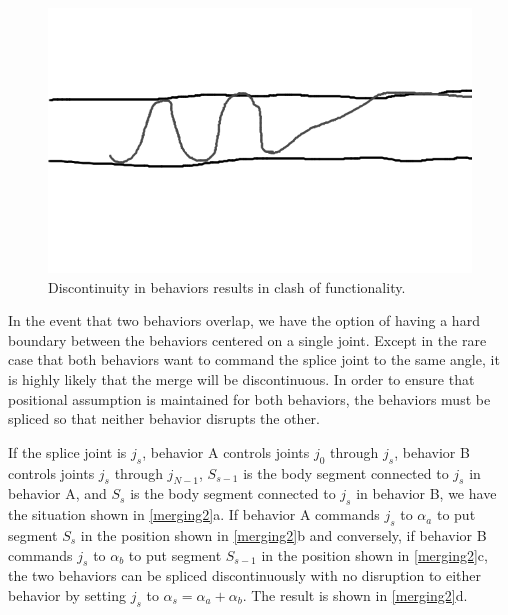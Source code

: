 \begin{figure}[htbp]
\centering
\includegraphics[keepaspectratio,width=400pt,height=0.75\textheight]{2_merging_1.png}
\caption{Discontinuity in behaviors results in clash of functionality.}
\label{merging1}
\end{figure}



In the event that two behaviors overlap, we have the option of having a hard boundary between the behaviors centered on a single joint. Except in the rare case that both behaviors want to command the splice joint to the same angle, it is highly likely that the merge will be discontinuous. In order to ensure that positional assumption is maintained for both behaviors, the behaviors must be spliced so that neither behavior disrupts the other.

If the splice joint is $j_s$, behavior A controls joints $j_0$ through $j_s$, behavior B controls joints $j_s$ through $j_{N-1}$, $S_{s-1}$ is the body segment connected to $j_s$ in behavior A, and $S_s$ is the body segment connected to $j_s$ in behavior B, we have the situation shown in \autoref{merging2}a. If behavior A commands $j_s$ to $\alpha_a$ to put segment $S_s$ in the position shown in \autoref{merging2}b and conversely, if behavior B commands $j_s$ to $\alpha_b$ to put segment $S_{s-1}$ in the position shown in \autoref{merging2}c, the two behaviors can be spliced discontinuously with no disruption to either behavior by setting $j_s$ to $\alpha_s = \alpha_a + \alpha_b$. The result is shown in \autoref{merging2}d.

